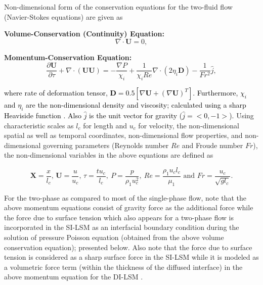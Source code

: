 \documentclass[preprint,12pt]{elsarticle}
\begin{document}
Non-dimensional form of the conservation equations for the two-fluid
flow (Navier-Stokes equations) are given as

\noindent \textbf{Volume-Conservation (Continuity) Equation:}
\begin{equation}
\nabla\cdot\mathbf{U}=0,\label{eq:conti}
\end{equation}


\noindent \textbf{Momentum-Conservation Equation:}
\begin{equation}
\frac{\partial\mathbf{U}}{\partial\tau}+\nabla\cdot\left(\mathbf{U}\mathbf{U}\right)=-\frac{\nabla P}{\chi_{i}}+\frac{1}{\chi_{i}Re}\nabla\cdot\left(2\eta_{i}\mathbf{D}\right)-\frac{1}{Fr^{2}}\hat{j},\label{eq:Mom}
\end{equation}


\noindent \textcolor{black}{where rate of deformation tensor, $\mathbf{D}=0.5\left[\nabla\mathbf{U}+\left(\nabla\mathbf{U}\right)^{T}\right]$.
Furthermore, $\chi_{i}$ and $\eta_{i}$ are the non-dimensional density
and viscosity; calculated using a sharp Heaviside function }\cite{shaikh2018}\textcolor{black}{.
Also $\hat{j}$ is the unit vector for gravity ($\hat{j}=<0,-1>$).
}Using characteristic scales as $l_{c}$ for length and $u_{c}$ for
velocity, the non-dimensional spatial as well as temporal coordinates,
non-dimensional flow properties, and non-dimensional governing parameters
(Reynolds number $Re$ and Froude number $Fr$), the non-dimensional variables in the above equations
are defined as

\[
\mathbf{X}=\frac{x}{l_{c}},\,\mathbf{U}=\frac{u}{u_{c}},\,\tau=\frac{tu_{c}}{l_{c}},\: P=\frac{p}{\rho_{1}u_{c}^{2}},\: Re=\frac{\rho_{1}u_{c}l_{c}}{\mu_{1}}\mbox{ and }Fr=\frac{u_{c}}{\sqrt{gl_{c}}}.
\]


For the two-phase as compared to most of the single-phase flow, note
that the above momentum equations consist of gravity force as the
additional force while the force due to surface tension which also
appears for a two-phase flow is incorporated in the SI-LSM as an interfacial
boundary condition during the solution of pressure Poisson equation
(obtained from the above volume conservation equation); presented
below. Also note that the force due to surface tension is considered as
a sharp surface force in the SI-LSM \cite{shaikh2018} while it is modeled
as a volumetric force term (within the thickness of the diffused interface)
in the above momentum equation for the DI-LSM \cite{gada2011}.
\end{document}
